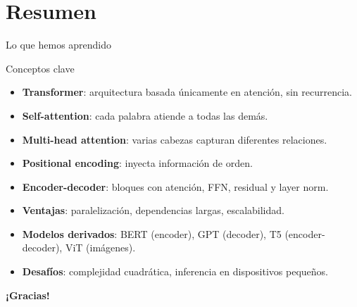 \documentclass[aspectratio=169, 10pt, xcolor=table]{beamer}
\begin{document}
\section{Resumen}

\begin{frame}{Lo que hemos aprendido}
    \begin{exampleblock}{Conceptos clave}
        \begin{itemize}
            \item \textbf{Transformer}: arquitectura basada únicamente en atención, sin recurrencia.
            \item \textbf{Self-attention}: cada palabra atiende a todas las demás.
            \item \textbf{Multi-head attention}: varias cabezas capturan diferentes relaciones.
            \item \textbf{Positional encoding}: inyecta información de orden.
            \item \textbf{Encoder-decoder}: bloques con atención, FFN, residual y layer norm.
            \item \textbf{Ventajas}: paralelización, dependencias largas, escalabilidad.
            \item \textbf{Modelos derivados}: BERT (encoder), GPT (decoder), T5 (encoder-decoder), ViT (imágenes).
            \item \textbf{Desafíos}: complejidad cuadrática, inferencia en dispositivos pequeños.
        \end{itemize}
    \end{exampleblock}
\end{frame}

\begin{frame}
    \centering
    \Huge \textbf{¡Gracias!}

\end{frame}
\end{document}
